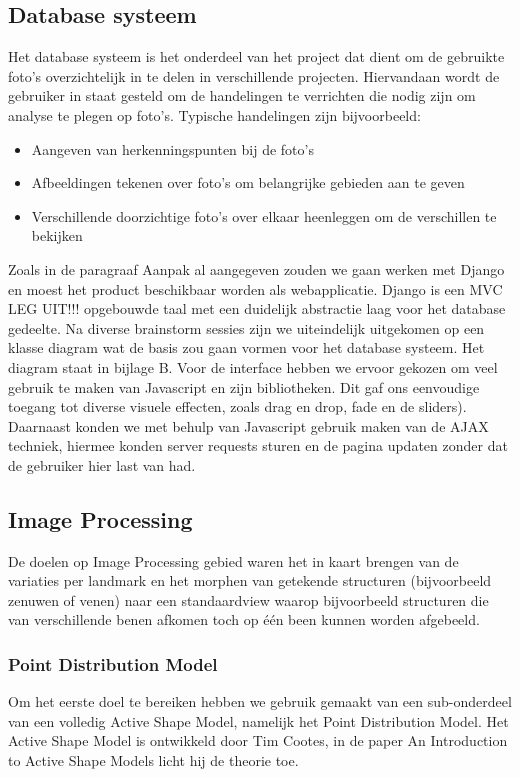 \subsection{Database systeem}
Het database systeem is het onderdeel van het project dat dient om de gebruikte foto's overzichtelijk in te delen in verschillende projecten. Hiervandaan wordt de gebruiker in staat gesteld om de handelingen te verrichten die nodig zijn om analyse te plegen op  foto's. Typische handelingen zijn bijvoorbeeld: 

\begin{itemize}
\item Aangeven van herkenningspunten bij de foto's
\item Afbeeldingen tekenen over foto's om belangrijke gebieden aan te geven
\item Verschillende doorzichtige foto's over elkaar heenleggen om de verschillen te bekijken
\end{itemize}

Zoals in de paragraaf Aanpak al aangegeven zouden we gaan werken met Django en moest het product beschikbaar worden als webapplicatie. Django is een MVC LEG UIT!!! opgebouwde taal met een duidelijk abstractie laag voor het database gedeelte. Na diverse brainstorm sessies zijn we uiteindelijk uitgekomen op een klasse diagram wat de basis zou gaan vormen voor het database systeem. Het diagram staat in bijlage B.
Voor de interface hebben we ervoor gekozen om veel gebruik te maken van Javascript en zijn bibliotheken. Dit gaf ons eenvoudige toegang tot diverse visuele effecten, zoals drag en drop, fade en de sliders). Daarnaast konden we met behulp van Javascript gebruik maken van de AJAX techniek, hiermee konden server requests sturen en de pagina updaten zonder dat de gebruiker hier last van had.

\subsection{Image Processing}
De doelen op Image Processing gebied waren het in kaart brengen van de variaties per landmark en het morphen van getekende structuren (bijvoorbeeld zenuwen of venen) naar een standaardview waarop bijvoorbeeld structuren die van verschillende benen afkomen toch op \'{e}\'{e}n been kunnen worden afgebeeld.

\subsubsection{Point Distribution Model}
Om het eerste doel te bereiken hebben we gebruik gemaakt van een sub-onderdeel van een volledig Active Shape Model, namelijk het Point Distribution Model. Het Active Shape Model is ontwikkeld door Tim Cootes, in de paper An Introduction to Active Shape Models licht hij de theorie toe.\cite{introASM}


